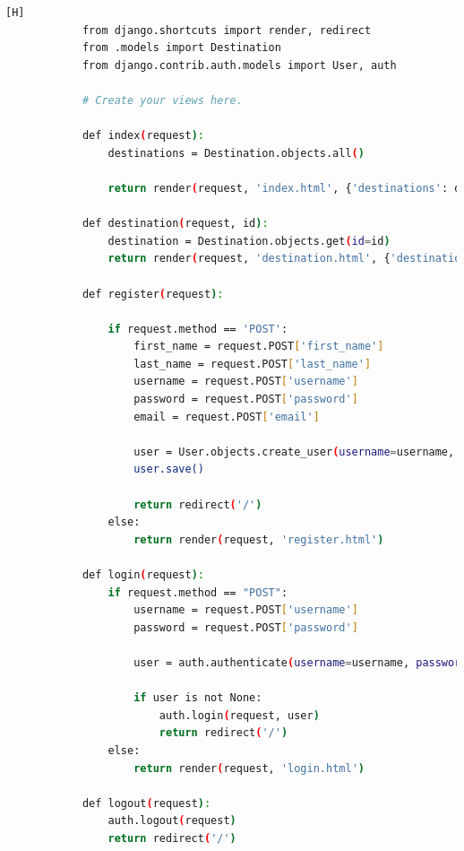 \documentclass{article}
\begin{document}
    	\begin{lstlisting}[language=bash,caption={views.py}][H]
            from django.shortcuts import render, redirect
            from .models import Destination
            from django.contrib.auth.models import User, auth
            
            # Create your views here.
            
            def index(request):
                destinations = Destination.objects.all()
            
                return render(request, 'index.html', {'destinations': destinations})
            
            def destination(request, id):
                destination = Destination.objects.get(id=id)
                return render(request, 'destination.html', {'destination': destination})
            
            def register(request):
            
                if request.method == 'POST':
                    first_name = request.POST['first_name']
                    last_name = request.POST['last_name']
                    username = request.POST['username']
                    password = request.POST['password']
                    email = request.POST['email']
            
                    user = User.objects.create_user(username=username, password=password, email=email, first_name=first_name, last_name=last_name)
                    user.save()
            
                    return redirect('/')
                else:
                    return render(request, 'register.html')
            
            def login(request):
                if request.method == "POST":
                    username = request.POST['username']
                    password = request.POST['password']
            
                    user = auth.authenticate(username=username, password=password)
            
                    if user is not None:
                        auth.login(request, user)
                        return redirect('/')
                else:
                    return render(request, 'login.html')
            
            def logout(request):
                auth.logout(request)
                return redirect('/')
    	\end{lstlisting}
     
\end{document}
